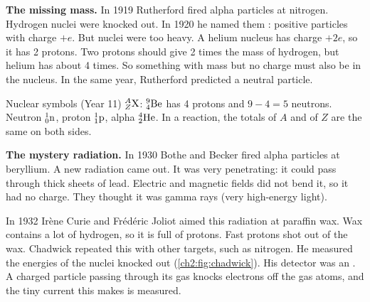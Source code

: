 \textbf{The missing mass.} In 1919 Rutherford fired alpha particles at nitrogen.
Hydrogen nuclei were knocked out. In 1920 he named them : positive
particles with charge $+e$. But nuclei were too heavy. A helium nucleus has
charge $+2e$, so it has 2 protons. Two protons should give 2 times the mass of
hydrogen, but helium has about 4 times. So something with mass but no charge
must also be in the nucleus. In the same year, Rutherford predicted a neutral particle.

\begin{refresher}{Nuclear symbols (Year 11)}
$\chTwoNuc{A}{Z}{X}$: $\chTwoNuc{9}{4}{Be}$ has 4 protons and $9-4 = 5$ neutrons.
Neutron $\chTwoNuc{1}{0}{n}$, proton $\chTwoNuc{1}{1}{p}$, alpha
$\chTwoNuc{4}{2}{He}$. In a reaction, the totals of $A$ and of $Z$ are the same
on both sides.
\end{refresher}

\textbf{The mystery radiation.} In 1930 Bothe and Becker fired alpha particles at
beryllium. A new radiation came out. It was very penetrating: it could pass
through thick sheets of lead. Electric and magnetic fields did not bend it, so it
had no charge. They thought it was gamma rays (very high-energy light).

In 1932 Irène Curie and Frédéric Joliot aimed this radiation at paraffin wax.
Wax contains a lot of hydrogen, so it is full of protons. Fast protons shot out
of the wax. Chadwick repeated this with other targets, such as nitrogen. He
measured the energies of the nuclei knocked out (\cref{ch2:fig:chadwick}). His
detector was an . A charged particle passing through
its gas knocks electrons off the gas atoms, and the tiny current this makes is
measured.

